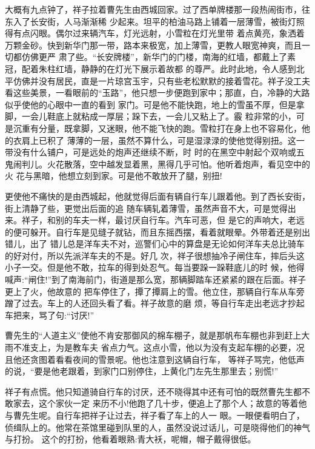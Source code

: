 \documentclass[11pt,a4paper,onecolumn]{article}
\begin{document}
大概有九点钟了，祥子拉着曹先生由西城回家。过了西单牌楼那一段热闹街市，往东入了长安街，人马渐渐稀
少起来。坦平的柏油马路上铺着一层薄雪，被街灯照得有点闪眼。偶尔过来辆汽车，灯光远射，小雪粒在灯光里带
着点黄亮，象洒着万颗金砂。快到新华门那一带，路本来极宽，加上薄雪，更教人眼宽神爽，而且一切都仿佛更严
肃了些。``长安牌楼''，新华门的门楼，南海的红墙，都戴上了素冠，配着朱柱红墙，静静的在灯光下展示着故都
的尊严。此时此地，令人感到北平仿佛并没有居民，直是一片琼宫玉宇，只有些老松默默的接着雪花。祥子没工夫
看这些美景，一看眼前的``玉路''，他只想一步便跑到家中；那直，白，冷静的大路似乎使他的心眼中一直的看到
家门。可是他不能快跑，地上的雪虽不厚，但是拿脚，一会儿鞋底上就粘成一厚层；跺下去，一会儿又粘上了。霰
粒非常的小，可是沉重有分量，既拿脚，又迷眼，他不能飞快的跑。雪粒打在身上也不容易化，他的衣肩上已积了
薄薄的一层，虽然不算什么，可是湿渌渌的使他觉得别扭。这一带没有什么铺户，可是远处的炮声还继续不断，时
时的在黑空中射起个双响或五鬼闹判儿。火花散落，空中越发显着黑，黑得几乎可怕。他听着炮声，看见空中的火
花与黑暗，他想立刻到家。可是他不敢放开了腿，别扭!

更使他不痛快的是由西城起，他就觉得后面有辆自行车儿跟着他。到了西长安街，街上清静了些，更觉出后面的追
随\myrule 车辆轧着薄雪，虽然声音不大，可是觉得出来。祥子，和别的车夫一样，最讨厌自行车。汽车可恶，但
是它的声响大，老远的便可躲开。自行车是见缝子就钻，而且东摇西摆，看着就眼晕。外带着还是别出错儿，出了
错儿总是洋车夫不对，巡警们心中的算盘是无论如何洋车夫总比骑车的好对付，所以先派洋车夫的不是。好几
次，祥子很想抽冷子闸住车，摔后头这小子一交。但是他不敢，拉车的得到处忍气。每当要跺一跺鞋底儿的时
候，他得喊声:``闸住!''到了南海前门，街道是那么宽，那辆脚踏车还紧紧的跟在后面。祥子更上了火，他故意的
把车停住了，撢了撢肩上的雪。他立住，那辆自行车从车旁蹭了过去。车上的人还回头看了看。祥子故意的磨
烦，等自行车走出老远才抄起车把来，骂了句:``讨厌!''

曹先生的``人道主义''使他不肯安那御风的棉车棚子，就是那帆布车棚也非到赶上大雨不准支上，为是教车夫
省点力气。这点小雪，他以为没有支起车棚的必要，况且他还贪图着看看夜间的雪景呢。他也注意到这辆自行车，
等祥子骂完，他低声的说，``要是他老跟着，到家门口别停住，上黄化门左先生那里去；别慌!''

祥子有点慌。他只知道骑自行车的讨厌，还不晓得其中还有可怕的\myrule 既然曹先生都不敢家去，这个家伙一定
来历不小!他跑了几十步，便追上了那个人；故意的等着他与曹先生呢。自行车把祥子让过去，祥子看了车上的人一
眼。一眼便看明白了，侦缉队上的。他常在茶馆里碰到队里的人，虽然没说过话儿，可是晓得他们的神气与打扮。
这个的打扮，他看着眼熟:青大袄，呢帽，帽子戴得很低。
\end{document}
